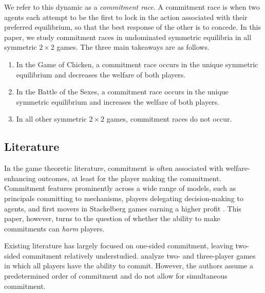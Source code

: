 \documentclass[letterpaper]{article}
\theoremstyle{definition}
\begin{document}
We refer to this dynamic as a \textit{commitment race}. A commitment race is when two agents each attempt to be the first to lock in the action associated with their preferred equilibrium, so that the best response of the other is to concede. 
In this paper, we study commitment races in undominated symmetric equilibria in all symmetric $2\times2$ games. The three main takeaways are as follows.
\begin{enumerate}
    \item In the Game of Chicken, a commitment race occurs in the unique symmetric equilibrium and decreases the welfare of both players.
    \item In the Battle of the Sexes, a commitment race occurs in the unique symmetric equilibrium and increases the welfare of both players.
    \item In all other symmetric $2\times2$ games, commitment races do not occur.
\end{enumerate}


\subsection*{Literature}
In the game theoretic literature, commitment is often associated with welfare-enhancing outcomes, at least for the player making the commitment. Commitment features prominently across a wide range of models, such as principals committing to mechanisms, players delegating decision-making to agents, and first movers in Stackelberg games earning a higher profit \citep[see the discussion in][]{kalai_commitment_2010}. This paper, however, turns to the question of whether the ability to make commitments can \textit{harm} players.

Existing literature has largely focused on one-sided commitment, leaving two-sided commitment relatively understudied. \citet{harrenstein_commitment_2007} analyze two- and three-player games in which all players have the ability to commit. However, the authors assume a predetermined order of commitment and do not allow for simultaneous commitment.
\end{document}
